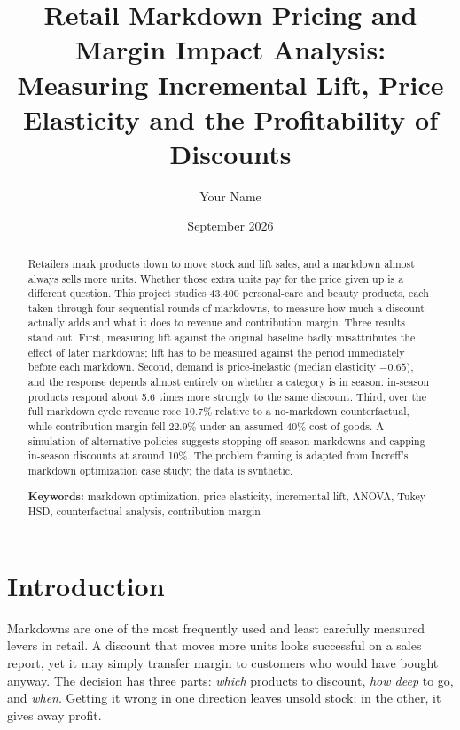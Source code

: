 \documentclass[11pt, a4paper]{article}
\title{Retail Markdown Pricing and Margin Impact Analysis:\\[2pt]
\large Measuring Incremental Lift, Price Elasticity and the Profitability of Discounts}
\author{Your Name {\setlength{\fboxsep}{0.2pt}\fcolorbox{white}{white}{\href{https://drive.google.com/your-link-here}{\small Project Link}}}}
\date{September 2026}
\begin{document}
\maketitle

\begin{abstract}
\noindent Retailers mark products down to move stock and lift sales, and a markdown almost always sells more units. Whether those extra units pay for the price given up is a different question. This project studies 43,400 personal-care and beauty products, each taken through four sequential rounds of markdowns, to measure how much a discount actually adds and what it does to revenue and contribution margin. Three results stand out. First, measuring lift against the original baseline badly misattributes the effect of later markdowns; lift has to be measured against the period immediately before each markdown. Second, demand is price-inelastic (median elasticity $-0.65$), and the response depends almost entirely on whether a category is in season: in-season products respond about 5.6 times more strongly to the same discount. Third, over the full markdown cycle revenue rose 10.7\% relative to a no-markdown counterfactual, while contribution margin fell 22.9\% under an assumed 40\% cost of goods. A simulation of alternative policies suggests stopping off-season markdowns and capping in-season discounts at around 10\%. The problem framing is adapted from Increff's markdown optimization case study; the data is synthetic.

\vspace{4pt}\noindent\textbf{Keywords:} markdown optimization, price elasticity, incremental lift, ANOVA, Tukey HSD, counterfactual analysis, contribution margin
\end{abstract}

\section{Introduction}
Markdowns are one of the most frequently used and least carefully measured levers in retail. A discount that moves more units looks successful on a sales report, yet it may simply transfer margin to customers who would have bought anyway. The decision has three parts: \emph{which} products to discount, \emph{how deep} to go, and \emph{when}. Getting it wrong in one direction leaves unsold stock; in the other, it gives away profit.
\end{document}
